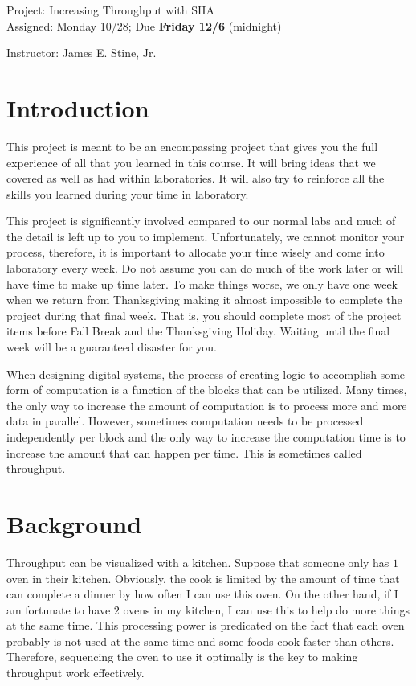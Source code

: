\documentclass{article}
\newcommand{\myassignment}{Project: Increasing Throughput with SHA}
\newcommand{\myduedate}{Assigned: Monday 10/28; Due \textbf{Friday 12/6} (midnight)}
\newcommand{\myinstructor}{Instructor: James E. Stine, Jr.}
\begin{document}
\begin{center}
  {\huge \myassignment} \\
  {\large \myduedate} \\
  \begin{flushright}
  \myinstructor \\
  \end{flushright}
\end{center}

\section{Introduction}

This project is meant to be an encompassing project that gives you the
full experience of all that you learned in this course.  It will bring
ideas that we covered as well as had within laboratories.  It will
also try to reinforce all the skills you learned during your time in
laboratory.

This project is significantly involved compared to our normal labs
and much of the detail is left
up to you to implement.  Unfortunately, we cannot monitor your
process, therefore, it is important to allocate your
time wisely and come into laboratory every week.  Do not assume you
can do much of the work later or will have time to make up time later.
To make things worse, we only have one
week when we return from Thanksgiving making it almost impossible to
complete the project during that final week.  That is, you should
complete most of the project items before Fall Break and the
Thanksgiving Holiday.  Waiting until the final week will be a guaranteed
disaster for you.  

When designing digital systems, the process of creating logic to
accomplish some form of computation is a function of the blocks that
can be utilized.  Many times, the only way to increase the amount of
computation is to process more and more data in parallel.  However,
sometimes computation needs to be processed independently per block
and the only way to increase the computation time is to increase the
amount that can happen per time.  This is sometimes called
throughput.


\section{Background}

Throughput can be visualized with a kitchen.  Suppose that someone only
has $1$ oven in their kitchen.  Obviously, the cook is limited by the
amount of time that can complete a dinner by how often I can use this
oven.  On the other hand, if I am fortunate to have $2$ ovens in my
kitchen, I can use this to help do more things at the same time.  This
processing power is predicated on the fact that each oven probably is
not used at the same time and some foods cook faster than others.
Therefore, sequencing the oven to use it optimally is the key to
making throughput work effectively.
\end{document}
